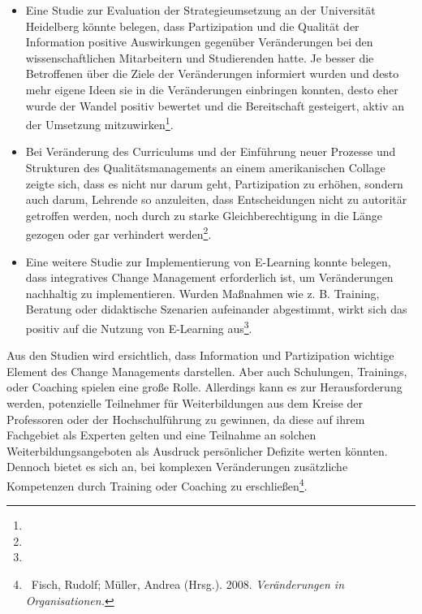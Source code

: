 \documentclass[a4paper]{article}
\newcommand\liststyleLiii{%
\renewcommand\labelitemi{•}
\renewcommand\labelitemii{◦}
\renewcommand\labelitemiii{${\blacksquare}$}
\renewcommand\labelitemiv{•}
}
\begin{document}
\bigskip

\liststyleLiii
\begin{itemize}
\item {\sffamily
Eine Studie zur Evaluation der Strategieumsetzung an der Universität Heidelberg könnte belegen, dass Partizipation und
die Qualität der Information positive Auswirkungen gegenüber Veränderungen bei den wissenschaftlichen Mitarbeitern und
Studierenden hatte. Je besser die Betroffenen über die Ziele der Veränderungen informiert wurden und desto mehr eigene
Ideen sie in die Veränderungen einbringen konnten, desto eher wurde der Wandel positiv bewertet und die Bereitschaft
gesteigert, aktiv an der Umsetzung mitzuwirken\footnote{}.}
\end{itemize}

\bigskip

\liststyleLiii
\begin{itemize}
\item {\sffamily
Bei Veränderung des Curriculums und der Einführung neuer Prozesse und Strukturen des Qualitätsmanagements an einem
amerikanischen Collage zeigte sich, dass es nicht nur darum geht, Partizipation zu erhöhen, sondern auch darum,
Lehrende so anzuleiten, dass Entscheidungen nicht zu autoritär getroffen werden, noch durch zu starke
Gleichberechtigung in die Länge gezogen oder gar verhindert werden\footnote{}. }


\bigskip
\item {\sffamily
Eine weitere Studie zur Implementierung von E-Learning konnte belegen, dass integratives Change Management erforderlich
ist, um Veränderungen nachhaltig zu implementieren. Wurden Maßnahmen wie z. B. Training, Beratung oder didaktische
Szenarien aufeinander abgestimmt, wirkt sich das positiv auf die Nutzung von E-Learning aus\footnote{}. }
\end{itemize}

\bigskip

{\sffamily
Aus den Studien wird ersichtlich, dass Information und Partizipation wichtige Element des Change Managements darstellen.
Aber auch Schulungen, Trainings, oder Coaching spielen eine große Rolle. Allerdings kann es zur Herausforderung werden,
potenzielle Teilnehmer für Weiterbildungen aus dem Kreise der Professoren oder der Hochschulführung zu gewinnen, da
diese auf ihrem Fachgebiet als Experten gelten und eine Teilnahme an solchen Weiterbildungsangeboten als Ausdruck
persönlicher Defizite werten könnten. Dennoch bietet es sich an, bei komplexen Veränderungen zusätzliche Kompetenzen
durch Training oder Coaching zu erschließen\footnote{\textcolor[rgb]{0.12941177,0.11764706,0.11764706}{\ Fisch, Rudolf;
Müller, Andrea (Hrsg.). 2008. }\textit{\textcolor[rgb]{0.12941177,0.11764706,0.11764706}{Veränderungen in
Organisationen.}}}. }
\end{document}
